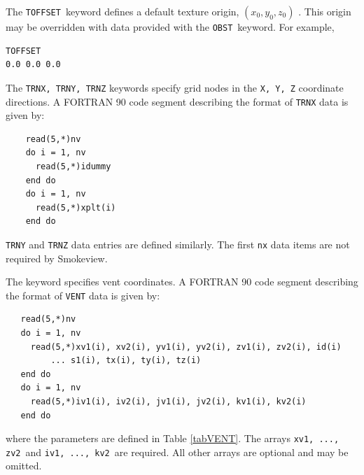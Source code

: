 \documentclass[11pt,twoside]{book}
\newcommand{\smokeview}{{Smokeview}}
\newcommand{\hitem}[1]{\item[{\bf #1} \hfill]}
\begin{document}
\hitem{TOFFSET}The {\tt TOFFSET}\ keyword defines a default texture origin, $(x_0, y_0, z_0)$ .
This origin may be overridden with data provided with the {\tt OBST}\ keyword. For example,

\begin{verbatim}
TOFFSET
0.0 0.0 0.0
\end{verbatim}

\hitem{TRNX,TRNY,TRNZ}The {\tt TRNX, TRNY, TRNZ} keywords specify
grid nodes in the {\tt X, Y, Z} coordinate directions.  A FORTRAN
90 code segment describing the format of {\tt TRNX} data is given
by:
\begin{verbatim}
    read(5,*)nv
    do i = 1, nv
      read(5,*)idummy
    end do
    do i = 1, nv
      read(5,*)xplt(i)
    end do
\end{verbatim}
{\tt TRNY} and {\tt TRNZ} data entries are defined similarly. The first {\tt nx} data items
are not required by \smokeview.

\hitem{VENT}The keyword specifies vent coordinates.
A FORTRAN 90 code segment describing the format of {\tt VENT} data is given by:
\begin{verbatim}
   read(5,*)nv
   do i = 1, nv
     read(5,*)xv1(i), xv2(i), yv1(i), yv2(i), zv1(i), zv2(i), id(i)
         ... s1(i), tx(i), ty(i), tz(i)
   end do
   do i = 1, nv
     read(5,*)iv1(i), iv2(i), jv1(i), jv2(i), kv1(i), kv2(i)
   end do
\end{verbatim}
where the parameters are defined in Table \ref{tabVENT}.  The arrays {\tt xv1,  ..., zv2}\ and {\tt iv1, ..., kv2}\ are
required. All other arrays are optional and may be omitted.
\end{document}
